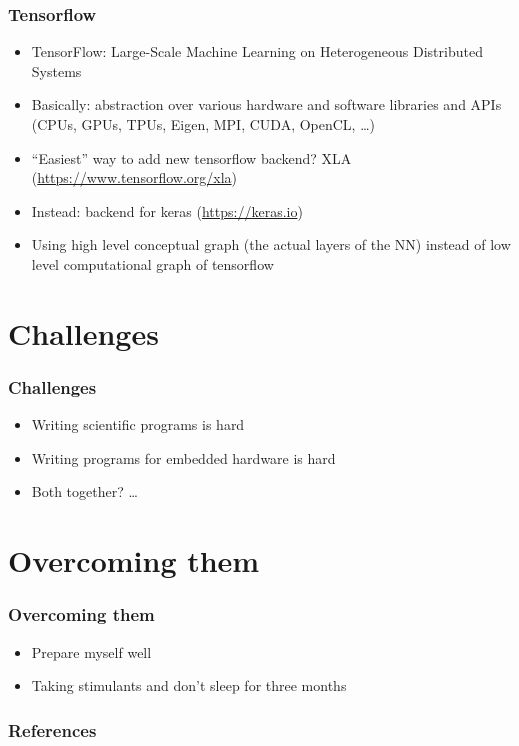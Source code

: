 \documentclass[xcolor=x11names,compress,usenames,dvipsnames,mathsans]{beamer}
\begin{document}
\begin{frame}[fragile]
  \frametitle{Tensorflow}

  \begin{itemize}[<+->]
    \item TensorFlow: Large-Scale Machine Learning on
          Heterogeneous Distributed Systems \cite{tf_2015}
    \item Basically: abstraction over various hardware and
          software libraries and APIs (CPUs, GPUs, TPUs,
          Eigen, MPI, CUDA, OpenCL, \dots)
    \item ``Easiest'' way to add new tensorflow backend? XLA
          (\url{https://www.tensorflow.org/xla})
    \item Instead: backend for keras (\url{https://keras.io})
    \item Using high level conceptual graph (the actual
          layers of the NN) instead of low level
          computational graph of tensorflow
  \end{itemize}
\end{frame}

\section{Challenges}

\begin{frame}[fragile]
  \frametitle{Challenges}

  \begin{itemize}[<+->]
    \item Writing scientific programs is hard
    \item Writing programs for embedded hardware is hard
    \item Both together? \dots
  \end{itemize}
\end{frame}

\section{Overcoming them}

\begin{frame}[fragile]
  \frametitle{Overcoming them}

  \begin{itemize}[<+->]
    \item Prepare myself well
    \item Taking stimulants and don't sleep for three
          months
  \end{itemize}
\end{frame}

\begin{frame}
  \frametitle{References}
  
\end{frame}
\end{document}
